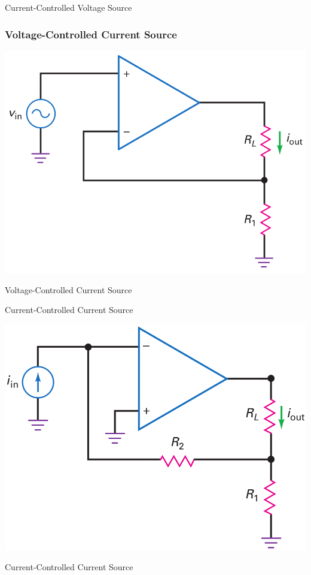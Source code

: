 \documentclass[pdflatex,compress]{beamer}
\begin{document}
\begin{frame}{Current-Controlled Voltage Source}

\end{frame}

\begin{frame}
	\frametitle{Voltage-Controlled Current Source}
	\begin{center}
		\includegraphics[width=0.8\linewidth]{img/Figure-17-10}
	\end{center}
\end{frame}

\begin{frame}{Voltage-Controlled Current Source}

\end{frame}

\begin{frame}{Current-Controlled Current Source}
	\begin{center}
		\includegraphics[width=0.8\linewidth]{img/Figure-17-12}
	\end{center}
\end{frame}

\begin{frame}{Current-Controlled Current Source}

\end{frame}
\end{document}

